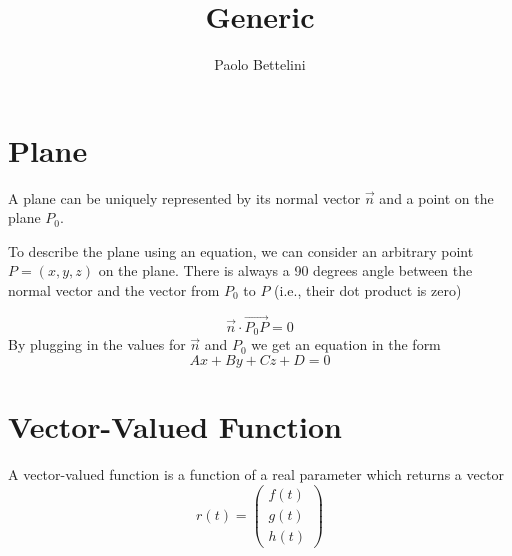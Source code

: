 \documentclass[a4paper]{article}
\title{Generic}
\author{Paolo Bettelini}
\date{}
\begin{document}
\section{Plane}

A plane can be uniquely represented by its
normal vector \(\vec{n}\)
and a point on the plane \(P_0\).

To describe the plane using an equation, we can
consider an arbitrary point \(P=(x,y,z)\) on the plane.
There is always a 90 degrees angle between the normal
vector and the vector from \(P_0\) to \(P\) (i.e., their dot product is zero)

\[
    \vec{n} \cdot \overrightarrow{P_0 P} = 0
\]
By plugging in the values for \(\vec{n}\) and \(P_0\)
we get an equation in the form
\[
    Ax+By+Cz+D=0
\]

\section{Vector-Valued Function}

A vector-valued function is a function of a real parameter
which returns a vector
\[
    r(t) = \begin{pmatrix}
        f(t) \\
        g(t) \\
        h(t)
        \end{pmatrix}
\]
\end{document}
